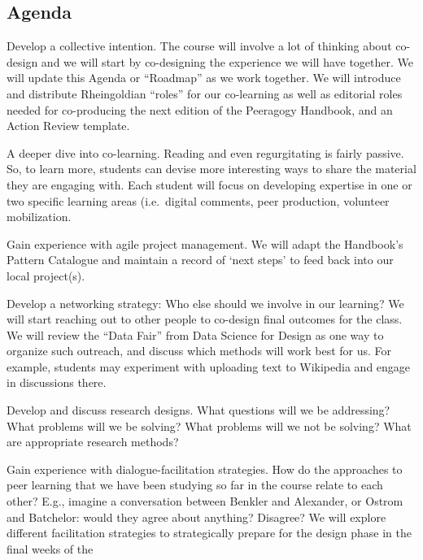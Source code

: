 \hypertarget{agenda}{%
\subsection{Agenda}\label{agenda}}

\begin{description}
\tightlist
\item[Wk 1: Introduction (Joe)]
Develop a collective intention. The course will involve a lot of
thinking about co-design and we will start by co-designing the
experience we will have together. We will update this Agenda or
``Roadmap'' as we work together. We will introduce and distribute
Rheingoldian ``roles'' for our co-learning as well as editorial roles
needed for co-producing the next edition of the Peeragogy Handbook, and
an Action Review template.
\item[Wk 2.]
A deeper dive into co-learning. Reading and even regurgitating is fairly
passive. So, to learn more, students can devise more interesting ways to
share the material they are engaging with. Each student will focus on
developing expertise in one or two specific learning areas (i.e.~digital
comments, peer production, volunteer mobilization.
\item[Wk 3]
Gain experience with agile project management. We will adapt the
Handbook's Pattern Catalogue and maintain a record of `next steps' to
feed back into our local project(s).
\item[Wk 4]
Develop a networking strategy: Who else should we involve in our
learning? We will start reaching out to other people to co-design final
outcomes for the class. We will review the ``Data Fair'' from Data
Science for Design as one way to organize such outreach, and discuss
which methods will work best for us. For example, students may
experiment with uploading text to Wikipedia and engage in discussions
there.
\item[Wk 5]
Develop and discuss research designs. What questions will we be
addressing? What problems will we be solving? What problems will we not
be solving? What are appropriate research methods?
\item[Wk 6]
Gain experience with dialogue-facilitation strategies. How do the
approaches to peer learning that we have been studying so far in the
course relate to each other? E.g., imagine a conversation between
Benkler and Alexander, or Ostrom and Batchelor: would they agree about
anything? Disagree? We will explore different facilitation strategies to
strategically prepare for the design phase in the final weeks of the

\end{description}
